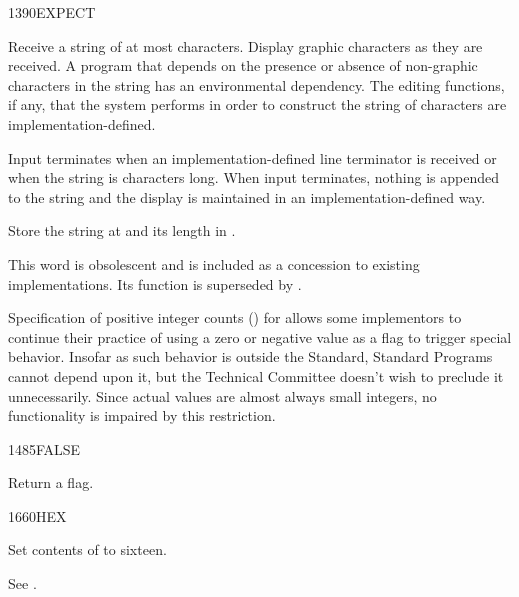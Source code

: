 \begin{worddef}{1390}{EXPECT}
\item {}

	Receive a string of at most  characters. Display graphic
	characters as they are received. A program that depends on
	the presence or absence of non-graphic characters in the
	string has an environmental dependency. The editing functions,
	if any, that the system performs in order to construct the
	string of characters are implementation-defined.

	Input terminates when an implementation-defined line terminator
	is received or when the string is  characters long. When
	input terminates, nothing is appended to the string and the
	display is maintained in an implementation-defined way.

	Store the string at  and its length in .

\note
	This word is obsolescent and is included as a concession to
	existing implementations. Its function is superseded
	by .

	\begin{defer}
	\rationale %
		Specification of positive integer counts () for
		 allows some implementors to continue their
		practice of using a zero or negative value as a flag to
		trigger special behavior. Insofar as such behavior is outside
		the Standard, Standard Programs cannot depend upon it, but
		the Technical Committee doesn't wish to preclude it
		unnecessarily. Since actual values are almost always small
		integers, no functionality is impaired by this restriction.
	\end{defer}
\end{worddef}


\begin{worddef}{1485}{FALSE}
\item {}

	Return a  flag.

\see {}
\end{worddef}


\begin{worddef}{1660}{HEX}
\item \stack{}{}

	Set contents of  to sixteen.

	\begin{defer}
	\testing\rmfamily
		See \rref{core:BASE}{BASE}.
	\end{defer}
\end{worddef}


